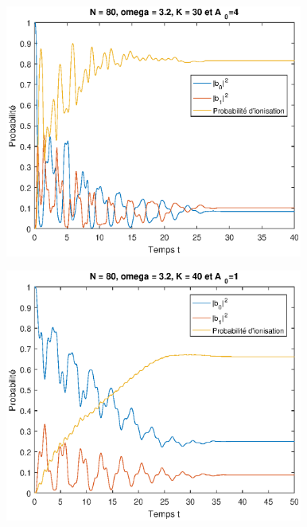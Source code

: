 \documentclass{report}
\begin{document}
\begin{figure}
\begin{center}
  \includegraphics[height=8.3cm]{N80_W32_K30_A4.eps}
      \end{center}
  \caption{}
  \label{fig_N80_W32_K30_A4}
\end{figure}

\begin{figure}
\begin{center}
  \includegraphics[height=8.3cm]{N80_W32_K40_A1.eps}
      \end{center}
  \caption{}
  \label{fig_N80_W32_K40_A1}
\end{figure}
\end{document}
